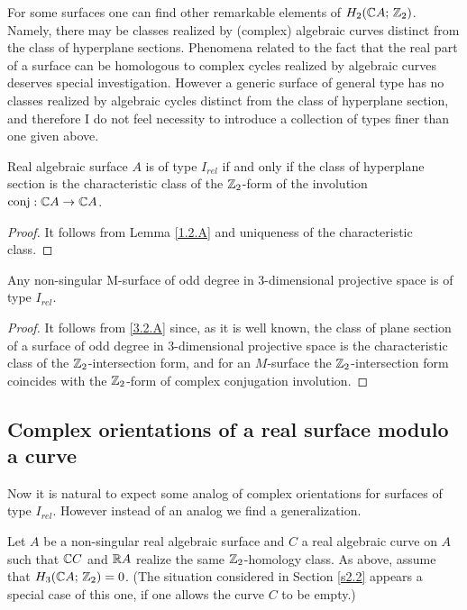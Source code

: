 \documentclass{article}
\numberwithin{equation}{section}
\begin{document}
For some surfaces  one can find other remarkable elements of
$H_2(\mathbb C A;\,\mathbb Z_2)$. Namely, there may be classes realized by
(complex) algebraic curves distinct from the class of hyperplane
sections.  Phenomena related to the fact that the real part of a
surface can be homologous to complex cycles realized by algebraic
curves deserves special investigation. However a generic surface of
general type has no classes realized by algebraic cycles distinct
from the class of hyperplane section, and therefore I do not feel
necessity to introduce a collection of types finer than one given
above.

\begin{lem}\label{3.1.A} Real algebraic surface $A$ is of type
$I_{rel}$ if and only if the class of hyperplane section is the
characteristic class of the $\mathbb Z_2$-form of the involution
$\operatorname{conj}:\mathbb C A\to\mathbb C A$. \end{lem}

\begin{proof} It follows from Lemma \ref{1.2.A} and uniqueness of the
characteristic class.   \end{proof}

\begin{thm}\label{3.1.B} Any non-singular M-surface of odd degree in
3-dimensional projective space is of type $I_{rel}$.
\end{thm}

\begin{proof} It follows from \ref{3.2.A} since, as it is well known, the
class of plane section of a surface of odd degree in 3-dimensional
projective space is the characteristic class of the $\mathbb Z_2$-intersection
form, and for an $M$-surface the $\mathbb Z_2$-intersection form coincides
with the $\mathbb Z_2$-form of complex conjugation involution. %
\end{proof}

\subsection{Complex orientations of a real surface modulo a
curve}\label{s3.2} 
Now it is natural to expect some analog of complex orientations for
surfaces of type $I_{rel}$. However instead of an analog we find
a generalization.

 Let $A$ be a non-singular real algebraic surface and $C$ a
real algebraic curve on $A$ such that $\mathbb C C$ and $\mathbb R A$ realize the same
$\mathbb Z_2$-homology class.  As above, assume that
$H_3(\mathbb C A;\,\mathbb Z_2)=0$. (The situation considered in Section \ref{s2.2} appears a
special case of this one, if one allows the curve $C$ to be empty.)
\end{document}
